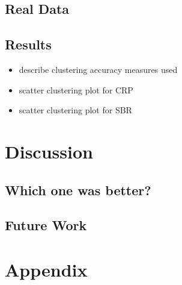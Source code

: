 \documentclass{article}
\begin{document}
\subsection{Real Data}

\subsection{Results}
\begin{itemize}
	\item describe clustering accuracy measures used
	\item scatter clustering plot for CRP
	\item scatter clustering plot for SBR
\end{itemize}


\section{Discussion}

\subsection{Which one was better?}
\subsection{Future Work}



{\footnotesize


}

\section{Appendix}
\end{document}
